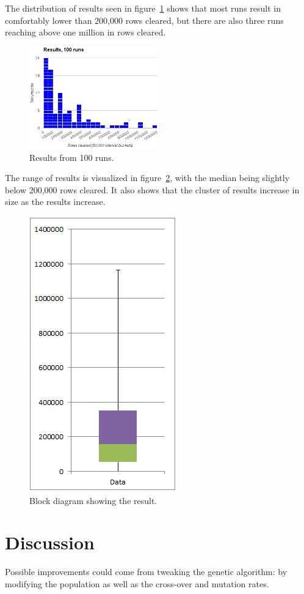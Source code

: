 \documentclass[twocolumn,12pt,journal]{IEEEtran_modified}
\begin{document}
The distribution of results seen in figure~\ref{fig:bucketresults} shows that most runs result in comfortably lower than 200,000 rows cleared, but there are also three runs reaching above one million in rows cleared.  

\begin{figure}[H]
  \centering
    \includegraphics[width=0.5\textwidth]{bucketresults.png}
  \caption{Results from 100 runs.}
  \label{fig:bucketresults}
\end{figure}

The range of results is visualized in figure~\ref{fig:blockresults}, with the median being slightly below 200,000 rows cleared. It also shows that the cluster of results increase in size as the results increase.

\begin{figure}[H]
  \centering
    \includegraphics[scale=0.7]{blockresults.png}
  \caption{Block diagram showing the result.}
  \label{fig:blockresults}
\end{figure}

\section{Discussion}
Possible improvements could come from tweaking the genetic algorithm: by modifying the population as well as the cross-over and mutation rates. 
\end{document}
